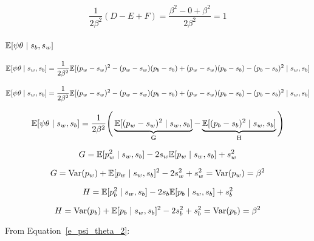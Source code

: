 \documentclass[a4paper,11pt]{article}
\theoremstyle{mytheor}
\newcommand{\E}{\Bbb{E}}
\newcommand{\Var}{\mathrm{Var}}
\begin{document}
\begin{equation}
    \label{e_psi_sq_all_combined}
    \frac{1}{2\beta^2}(D-E+F)=\frac{\beta^2-0+\beta^2}{2\beta^2} = 1
\end{equation}

\subsubsection{$\E[\psi\theta \mid s_b,s_w]$}

\begin{equation}
    \label{e_psi_theta}
    \Bbb{E}[\psi\theta\mid s_w,s_b] = \frac{1}{2\beta^2}\Bbb{E}[(p_w-s_w)^2-(p_w-s_w)(p_b-s_b)+(p_w-s_w)(p_b-s_b)-(p_b-s_b)^2 \mid s_w,s_b]
\end{equation}

\begin{equation}
    \label{e_psi_theta_1}
    \Bbb{E}[\psi\theta\mid s_w,s_b] = \frac{1}{2\beta^2}\Bbb{E}[(p_w-s_w)^2-(p_w-s_w)(p_b-s_b)+(p_w-s_w)(p_b-s_b)-(p_b-s_b)^2 \mid s_w,s_b]
\end{equation}

\begin{equation}
    \label{e_psi_theta_2}
    \Bbb{E}[\psi\theta\mid s_w,s_b] = \frac{1}{2\beta^2} \Bigg( \underbrace{\Bbb{E}[(p_w-s_w)^2 \mid s_w,s_b]}_\text{G} - \underbrace{\E[(p_b-s_b)^2 \mid s_w,s_b]}_\text{H} \Bigg)
\end{equation}

\begin{equation}
    \label{e_psi_theta_3}
    G=\Bbb{E}[p_w^2\mid s_w,s_b] - 2s_w\Bbb{E}[p_w\mid s_w,s_b] + s_{w}^{2}
\end{equation}

\begin{equation}
    \label{e_psi_theta_4}
    G=\Var(p_w)+\E[p_w\mid s_w,s_b]^2 - 2s_w^2 + s_{w}^{2} = \Var(p_w) = \beta^2
\end{equation}

\begin{equation}
    \label{e_psi_theta_5}
    H=\Bbb{E}[p_b^2\mid s_w,s_b] - 2s_b\Bbb{E}[p_b\mid s_w,s_b] + s_{b}^{2}
\end{equation}

\begin{equation}
    \label{e_psi_theta_6}
    H=\Var(p_b)+\E[p_b\mid s_w,s_b]^2 - 2s_b^2 + s_{b}^{2} = \Var(p_b) = \beta^2
\end{equation}

From Equation~\ref{e_psi_theta_2}:
\end{document}
